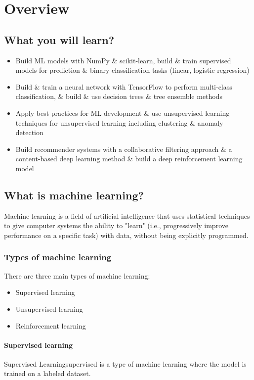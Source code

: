 \chapter{Overview}
    \section{What you will learn?}
    \begin{itemize}
        \item Build ML models with NumPy \& scikit-learn, %
        build \& train supervised models for prediction \& binary classification tasks (linear, logistic regression)
        \item Build \& train a neural network with TensorFlow to perform %
        multi-class classification, \& build \& use decision trees \& tree ensemble methods
        \item Apply best practices for ML development \& use unsupervised learning %
        techniques for unsupervised learning including clustering \& anomaly detection
        \item Build recommender systems with a collaborative filtering approach %
        \& a content-based deep learning method \& build a deep reinforcement learning model
    \end{itemize}

    \section{What is machine learning?}
    Machine learning is a field of artificial intelligence that uses statistical techniques to give computer systems the ability to "learn" (i.e., progressively improve performance on a specific task) with data, without being explicitly programmed.

    \subsection*{Types of machine learning}
    There are three main types of machine learning:
    \begin{itemize}
        \item Supervised learning
        \item Unsupervised learning
        \item Reinforcement learning
    \end{itemize}
    
    \subsubsection*{Supervised learning}
    \begin{dfnbox}{Supervised Learning}{supervised}
         is a type of machine learning where the model is trained on a labeled dataset.
    \end{dfnbox}

